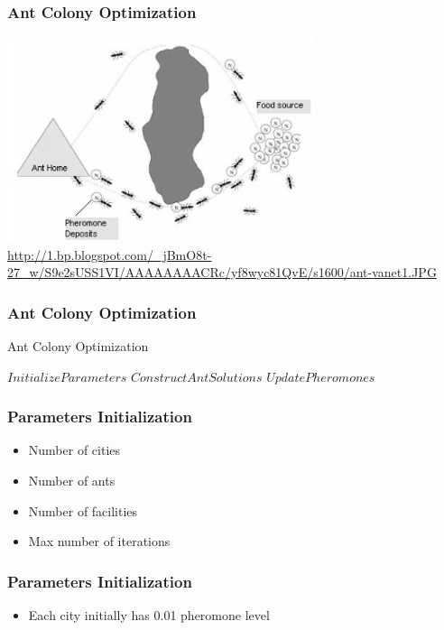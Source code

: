\documentclass[12pt]{beamer}
\begin{document}
\begin{frame}
\frametitle{Ant Colony Optimization}
\begin{center}
\includegraphics[height=60mm]{Images/ant1}\\
\tiny{\url{http://1.bp.blogspot.com/_jBmO8t-27_w/S9e2sUSS1VI/AAAAAAAACRc/yf8wyc81QvE/s1600/ant-vanet1.JPG}}
\end{center}
\end{frame}

\begin{frame}[fragile]
\frametitle{Ant Colony Optimization}
\begin{algorithm}[H]
\caption{Ant Colony Optimization}\label{alg:Ant Colony Optimization}
\begin{algorithmic}[1]

\State $Initialize Parameters$
\State $ConstructAntSolutions$
\State $UpdatePheromones$
\EndWhile
\end{algorithmic}
\end{algorithm}
\end{frame}

\begin{frame}
\frametitle{Parameters Initialization}
\begin{itemize}
\item Number of cities
\item Number of ants
\item Number of facilities
\item Max number of iterations
\end{itemize}
\end{frame}


\begin{frame}
\frametitle{Parameters Initialization}
\begin{itemize}
\item Each city initially has 0.01 pheromone level
\end{itemize}
\end{frame}
\end{document}
